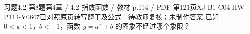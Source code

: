 \par\noindent\begin{minipage}{\linewidth}
\begin{bankitem}{习题4.2 第8题}{第4章 / 4.2 指数函数 / 教材 p.114 / PDF 第121页}{XJ-B1-C04-HW-P114-Y0667}{已对照原页转写题干及公式；待教师复核；未制作答案}
已知 $0<a<1$，$b<-1$，函数 $y=a^x+b$ 的图象不经过哪个象限？
\end{bankitem}
\end{minipage}\par\medskip

